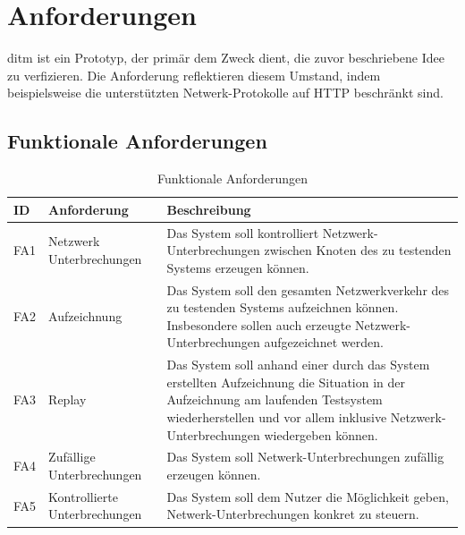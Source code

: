 \documentclass[12pt,a4paper]{report}
\begin{document}
\section{Anforderungen}
ditm ist ein Prototyp, der primär dem Zweck dient, die zuvor beschriebene Idee zu verfizieren.
Die Anforderung reflektieren diesem Umstand, indem beispielsweise die unterstützten Netwerk-Protokolle auf HTTP beschränkt sind.
\subsection{Funktionale Anforderungen}
\begin{table}[H]
	\centering
	\caption{Funktionale Anforderungen}
	\label{tab:fa}
	\begin{tabular}{|l|l|p{7cm}|}
		\hline
		ID   & Anforderung                   & Beschreibung                                                                                                                                                                                                          \\ \hline
		FA1  & Netzwerk Unterbrechungen      & Das System soll kontrolliert Netzwerk-Unterbrechungen zwischen Knoten des zu testenden Systems erzeugen können.                                                                                                       \\ \hline
		FA2  & Aufzeichnung                  & Das System soll den gesamten Netzwerkverkehr des zu testenden Systems aufzeichnen können. Insbesondere sollen auch erzeugte Netzwerk-Unterbrechungen aufgezeichnet werden.                                            \\ \hline
		FA3  & Replay                        & Das System soll anhand einer durch das System erstellten Aufzeichnung die Situation in der Aufzeichnung am laufenden Testsystem wiederherstellen und vor allem inklusive Netzwerk-Unterbrechungen wiedergeben können. \\ \hline
		FA4  & Zufällige Unterbrechungen     & Das System soll Netwerk-Unterbrechungen zufällig erzeugen können.                                                                                                                                                     \\ \hline
		FA5  & Kontrollierte Unterbrechungen & Das System soll dem Nutzer die Möglichkeit geben, Netwerk-Unterbrechungen konkret zu steuern.                                                                                                                         \\ \hline

\end{tabular}
\end{table}
\end{document}
